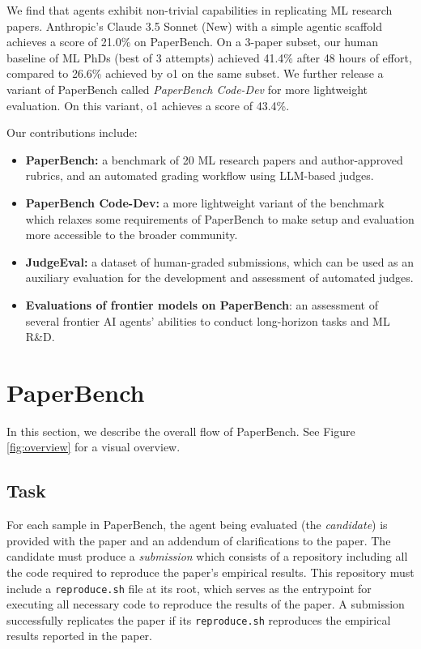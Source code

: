 \documentclass{article}
\theoremstyle{plain}
\theoremstyle{definition}
\theoremstyle{remark}
\begin{document}
We find that agents exhibit non-trivial capabilities in replicating ML research papers. Anthropic’s Claude 3.5 Sonnet (New) with a simple agentic scaffold achieves a score of 21.0\% on PaperBench. On a 3-paper subset, our human baseline of ML PhDs (best of 3 attempts) achieved 41.4\% after 48 hours of effort, compared to 26.6\% achieved by o1 on the same subset. We further release a variant of PaperBench called \textit{PaperBench Code-Dev} for more lightweight evaluation. On this variant, o1 achieves a score of 43.4\%.

Our contributions include:
\begin{itemize}[noitemsep,topsep=0pt]
    \item \textbf{PaperBench:} a benchmark of 20 ML research papers and author-approved rubrics, and an automated grading workflow using LLM-based judges.
    \item \textbf{PaperBench Code-Dev:} a more lightweight variant of the benchmark which relaxes some requirements of PaperBench to make setup and evaluation more accessible to the broader community.
    \item \textbf{JudgeEval:} a dataset of human-graded submissions, which can be used as an auxiliary evaluation for the development and assessment of automated judges.
    \item \textbf{Evaluations of frontier models on PaperBench}: an assessment of several frontier AI agents’ abilities to conduct long-horizon tasks and ML R\&D.
\end{itemize}

\section{PaperBench}

In this section, we describe the overall flow of PaperBench. See Figure \ref{fig:overview} for a visual overview.

\subsection{Task}
For each sample in PaperBench, the agent being evaluated (the \textit{candidate}) is provided with the paper and an addendum of clarifications to the paper. The candidate must produce a \textit{submission} which consists of a repository including all the code required to reproduce the paper’s empirical results. This repository must include a \texttt{reproduce.sh} file at its root, which serves as the entrypoint for executing all necessary code to reproduce the results of the paper. A submission successfully replicates the paper if its \texttt{reproduce.sh} reproduces the empirical results reported in the paper.
\end{document}
